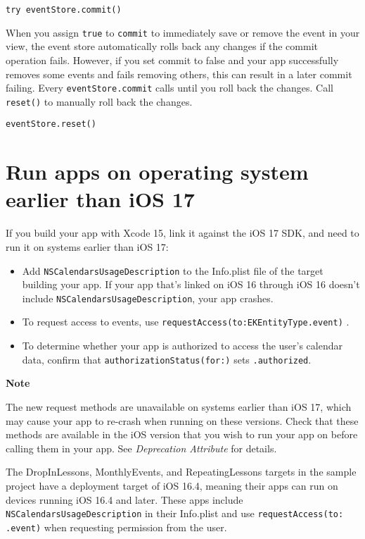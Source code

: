 \documentclass{article}
\begin{document}
\texttt{try eventStore.commit()}

When you assign \texttt{true} to \texttt{commit} to immediately save or remove the event in your view, the event store automatically rolls back any changes if the commit operation fails. However, if you set commit to false and your app successfully removes some events and fails removing others, this can result in a later commit failing. Every \texttt{eventStore.commit} calls until you roll back the changes. Call \texttt{reset()} to manually roll back the changes.

\texttt{eventStore.reset()}

\section*{Run apps on operating system earlier than iOS 17}

If you build your app with Xcode 15, link it against the iOS 17 SDK, and need to run it on systems earlier than iOS 17:

\begin{itemize}
    \item Add \texttt{NSCalendarsUsageDescription} to the Info.plist file of the target building your app. If your app that's linked on iOS 16 through iOS 16 doesn't include \texttt{NSCalendarsUsageDescription}, your app crashes.
    \item To request access to events, use \texttt{requestAccess(to:EKEntityType.event)} .
    \item To determine whether your app is authorized to access the user’s calendar data, confirm that \texttt{authorizationStatus(for:)} sets \texttt{.authorized}.
\end{itemize}

\textbf{Note}

The new request methods are unavailable on systems earlier than iOS 17, which may cause your app to re-crash when running on these versions. Check that these methods are available in the iOS version that you wish to run your app on before calling them in your app. See \textit{Deprecation Attribute} for details.

The DropInLessons, MonthlyEvents, and RepeatingLessons targets in the sample project have a deployment target of iOS 16.4, meaning their apps can run on devices running iOS 16.4 and later. These apps include \texttt{NSCalendarsUsageDescription} in their Info.plist and use \texttt{requestAccess(to: .event)} when requesting permission from the user.
\end{document}
